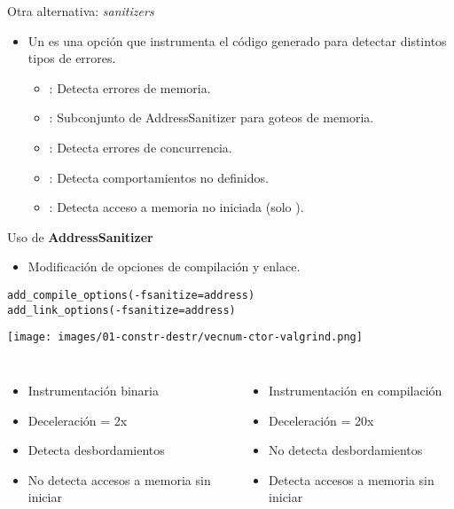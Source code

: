 \begin{frame}[t]{Otra alternativa: \emph{sanitizers}}
\begin{itemize}
  \item Un  es una opción que instrumenta el código generado
        para detectar distintos tipos de errores.
    \begin{itemize}
      \item {}: Detecta errores de memoria.
      \item {}: Subconjunto de AddressSanitizer para goteos de memoria.
      \item {}: Detecta errores de concurrencia.
      \item {}: Detecta comportamientos no definidos.
      \item {}: Detecta acceso a memoria no iniciada (solo ).
    \end{itemize}
\end{itemize}
\end{frame}

\begin{frame}[t,fragile]{Uso de \textbf{AddressSanitizer}}
\begin{itemize}
  \item Modificación de opciones de compilación y enlace.
\end{itemize}
\begin{lstlisting}
add_compile_options(-fsanitize=address)
add_link_options(-fsanitize=address)
\end{lstlisting}
\texttt{[image: images/01-constr-destr/vecnum-ctor-valgrind.png]}

\begin{columns}[T]
{
\begin{itemize}
  \item Instrumentación binaria
  \item Deceleración = 2x
  \item Detecta desbordamientos
  \item No detecta accesos a memoria sin iniciar
\end{itemize}
}

{
\begin{itemize}
  \item Instrumentación en compilación
  \item Deceleración = 20x
  \item No detecta desbordamientos
  \item Detecta accesos a memoria sin iniciar
\end{itemize}
}

\end{columns}
\end{frame}
